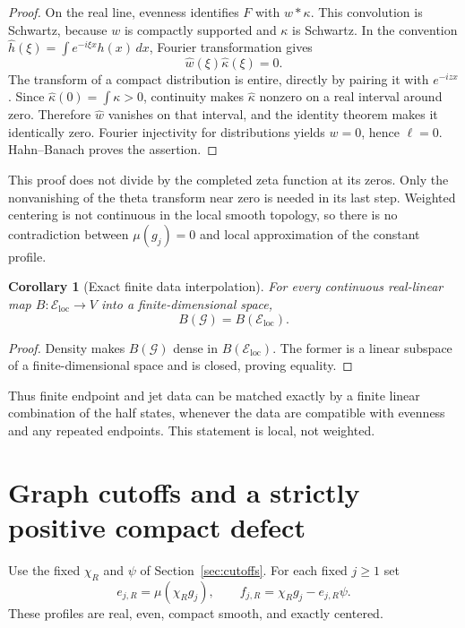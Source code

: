 \documentclass[11pt,a4paper]{article}
\numberwithin{equation}{section}
\newtheorem{corollary}[theorem]{Corollary}
\theoremstyle{definition}
\theoremstyle{remark}
\newcommand{\Eloc}{\mathcal E_{\mathrm{loc}}}
\begin{document}
\begin{proof}
On the real line, evenness identifies $F$ with $w*\kappa$. This convolution is Schwartz, because $w$ is compactly supported and $\kappa$ is Schwartz. In the convention $\widehat h(\xi)=\int e^{-i\xi x}h(x)\,dx$, Fourier transformation gives
\[
 \widehat w(\xi)\widehat\kappa(\xi)=0.
\]
The transform of a compact distribution is entire, directly by pairing it with $e^{-izx}$. Since $\widehat\kappa(0)=\int\kappa>0$, continuity makes $\widehat\kappa$ nonzero on a real interval around zero. Therefore $\widehat w$ vanishes on that interval, and the identity theorem makes it identically zero. Fourier injectivity for distributions yields $w=0$, hence $\ell=0$. Hahn--Banach proves the assertion.
\end{proof}

This proof does not divide by the completed zeta function at its zeros. Only the nonvanishing of the theta transform near zero is needed in its last step. Weighted centering is not continuous in the local smooth topology, so there is no contradiction between $\mu(g_j)=0$ and local approximation of the constant profile.

\begin{corollary}[Exact finite data interpolation]\label{cor:finiteimage}
For every continuous real-linear map $B:\Eloc\to V$ into a finite-dimensional space,
\[
 B(\mathcal G)=B(\Eloc).
\]
\end{corollary}
\begin{proof}
Density makes $B(\mathcal G)$ dense in $B(\Eloc)$. The former is a linear subspace of a finite-dimensional space and is closed, proving equality.
\end{proof}

Thus finite endpoint and jet data can be matched exactly by a finite linear combination of the half states, whenever the data are compatible with evenness and any repeated endpoints. This statement is local, not weighted.

\section{Graph cutoffs and a strictly positive compact defect}\label{sec:graph}

Use the fixed $\chi_R$ and $\psi$ of Section~\ref{sec:cutoffs}. For each fixed $j\ge1$ set
\begin{equation}\label{eq:fjR}
 e_{j,R}=\mu(\chi_Rg_j),\qquad
 f_{j,R}=\chi_Rg_j-e_{j,R}\psi.
\end{equation}
These profiles are real, even, compact smooth, and exactly centered.
\end{document}
